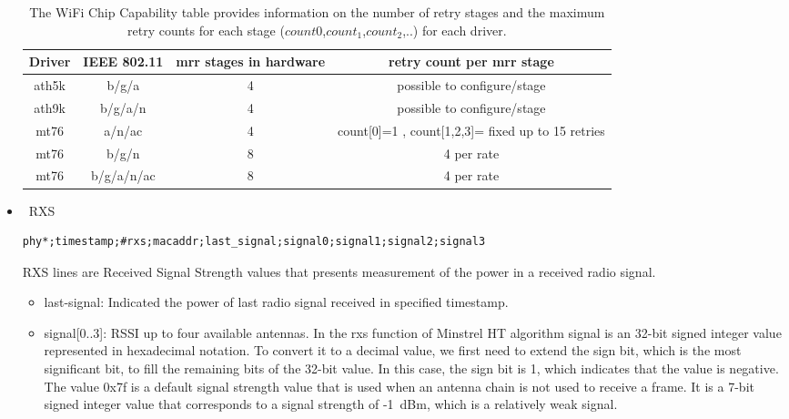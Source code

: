 \begin{sloppypar}
\begin{itemize}
\begin{itemize}
    \end{itemize}
\begin{table}[ht]
    \centering
    \begin{tabular}{||c c c c||} 
         \hline
         Driver & IEEE 802.11 & mrr stages in hardware & retry count per mrr stage \\ [0.5ex] 
         \hline\hline
         ath5k & b/g/a & 4 & possible to configure/stage \\ 
         \hline
         ath9k & b/g/a/n & 4 & possible to configure/stage \\
         \hline
         mt76 & a/n/ac & 4 & count[0]=1 , count[1,2,3]= fixed up to 15 retries \\
         \hline
         mt76 & b/g/n & 8 & 4 per rate \\
         \hline
         mt76 & b/g/a/n/ac & 8 & 4 per rate \\ [1ex] 
         \hline
    \end{tabular}
    \caption[WiFi Chip Capabilities]{The WiFi Chip Capability table provides information on the number of retry stages and the maximum retry counts for each stage ($count{0}$,$count_{1}$,$count_{2}$,..)  for each driver.}\label{tab:3a}  
  \end{table}  
  
\item \ RXS
\label{rxs}
\begin{lstlisting}[basicstyle=\small]
phy*;timestamp;#rxs;macaddr;last_signal;signal0;signal1;signal2;signal3
\end{lstlisting}
RXS lines are Received Signal Strength values that presents measurement of the power in a received radio signal.

 \begin{itemize}
     \item last-signal: Indicated the power of last radio signal received in specified timestamp.
     \item signal[0..3]: RSSI up to four available antennas. In the rxs function of Minstrel HT algorithm signal is an 32-bit signed integer value represented in hexadecimal notation. To convert it to a decimal value, we first need to extend the sign bit, which is the most significant bit, to fill the remaining bits of the 32-bit value. In this case, the sign bit is 1, which indicates that the value is negative. The value 0x7f is a default signal strength value that is used when an antenna chain is not used to receive a frame. It is a 7-bit signed integer value that corresponds to a signal strength of -1~dBm, which is a relatively weak signal. 
     

\end{itemize}
\end{itemize}
\end{sloppypar}
